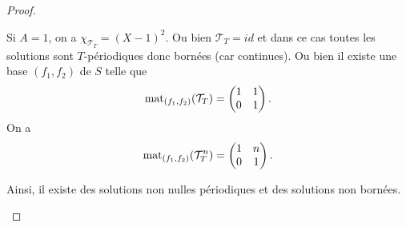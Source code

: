 \documentclass[12pt]{article}
\begin{document}
\begin{proof}
\begin{enumerate}
		Si $A=1$, on a $\chi_{\mathcal{T}_{T}}=(X-1)^{2}$. Ou bien $\mathcal{T}_{T}=id$ et dans ce cas toutes les solutions sont $T$-périodiques donc bornées (car continues). Ou bien il existe une base $(f_1,f_2)$ de $S$ telle que 
		\begin{equation}
			\operatorname{mat}_{(f_1,f_2)}(\mathcal{T}_{T})=\begin{pmatrix}
				1&1\\
				0&1
			\end{pmatrix}.
		\end{equation}
		On a 
		\begin{equation}
			\operatorname{mat}_{(f_1,f_2)}(\mathcal{T}_{T}^{n})=\begin{pmatrix}
				1&n\\0&1
			\end{pmatrix}.
		\end{equation}

		Ainsi, il existe des solutions non nulles périodiques et des solutions non bornées.
	\end{enumerate}
\end{proof}
\end{document}
